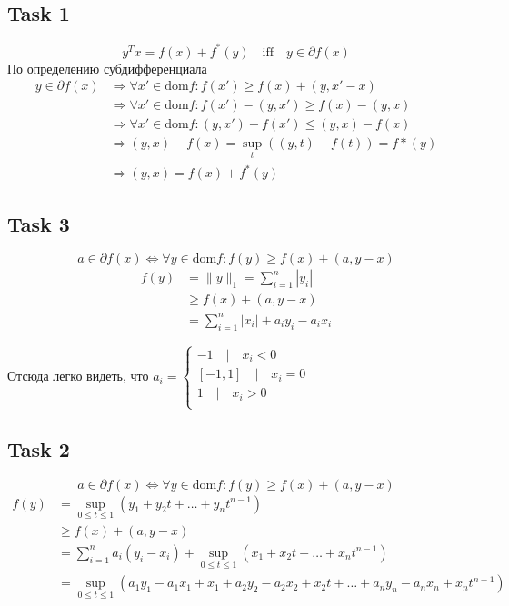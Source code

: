 \documentclass[12pt]{exam}
\begin{document}
\subsection*{Task 1}
$$ y^T x = f(x) + f^*(y) \quad \mathrm{iff} \quad y \in \partial f(x) $$
По определению субдифференциала
\begin{align*}
    y \in \partial f(x) 
        &\Rightarrow \forall x' \in \mathrm{dom} f: f(x') \geq f(x) + (y, x' - x) \\
        &\Rightarrow \forall x' \in \mathrm{dom} f: f(x') - (y, x') \geq f(x) - (y, x) \\
        &\Rightarrow \forall x' \in \mathrm{dom} f: (y, x') - f(x') \leq (y, x) - f(x) \\
        &\Rightarrow (y, x) - f(x) = \sup_t ((y, t) - f(t)) = f*(y) \\
        &\Rightarrow (y, x) = f(x) + f^*(y)
\end{align*} 

\subsection*{Task 3}
$$ a \in \partial f(x) \Leftrightarrow \forall y \in \mathrm{dom} f: f(y) \geq f(x) + (a, y - x)$$
\begin{align*}
    f(y) 
        &= \| y \|_1 = \sum_{i=1}^n | y_i | \\
        &\geq f(x) + (a, y - x) \\
        &= \sum_{i=1}^n | x_i | + a_i y_i - a_i x_i
\end{align*}

Отсюда легко видеть, что $a_i = \begin{cases}
    -1 \quad | \quad x_i < 0 \\
    [-1, 1] \quad | \quad x_i = 0 \\
    1 \quad | \quad x_i > 0 \\
\end{cases}$

\subsection*{Task 2}
$$ a \in \partial f(x) \Leftrightarrow \forall y \in \mathrm{dom} f: f(y) \geq f(x) + (a, y - x)$$
\begin{align*}
    f(y) 
        &= \sup_{0 \leq t \leq 1} (y_1 + y_2 t + \ldots + y_n t^{n - 1}) \\
        &\geq f(x) + (a, y - x) \\
        &= \sum_{i=1}^n a_i(y_i - x_i) + \sup_{0 \leq t \leq 1} (x_1 + x_2 t + \ldots + x_n t^{n - 1}) \\
        &= \sup_{0 \leq t \leq 1} (a_1y_1 - a_1x_1 + x_1 + a_2y_2 - a_2x_2 + x_2 t + \ldots + a_ny_n - a_nx_n + x_n t^{n - 1})
\end{align*}
\end{document}
